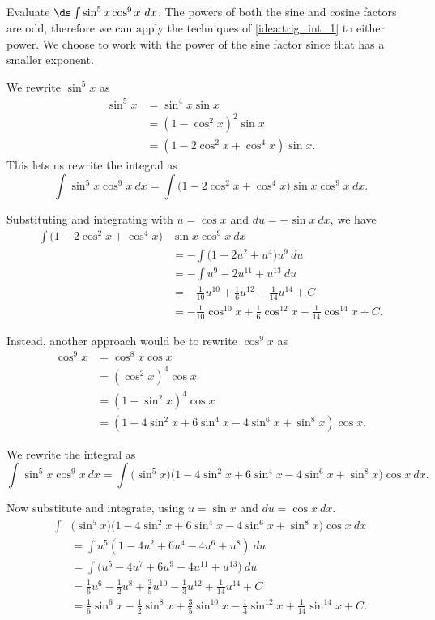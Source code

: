 \begin{example}\label{ex_trigint2}
Evaluate $\ds \int\sin^5x\cos^9x\ dx$.
\solution
The powers of both the sine and cosine factors are odd, therefore we can apply the techniques of \autoref{idea:trig_int_1} to either power.
We choose to work with the power of the sine factor since that has a smaller exponent.

We rewrite $\sin^5x$ as
\begin{align*}
 \sin^5x&=\sin^4x\sin x\\
 &=(1-\cos^2x)^2\sin x\\
 &=(1-2\cos^2x+\cos^4x)\sin x.
\end{align*}
This lets us rewrite the integral as
\[
\int\sin^5x\cos^9x\ dx=\int\big(1-2\cos^2x+\cos^4x\big)\sin x\cos^9x\ dx.
\]

Substituting and integrating with $u=\cos x$ and $du=-\sin x\ dx$, we have
\begin{align*}
\int\big(1-2\cos^2x+\cos^4x\big)&\sin x\cos^9x\ dx\\
&=-\int\big(1-2u^2+u^4)u^9\ du\\
&=-\int u^9-2u^{11}+u^{13}\ du\\
&=-\frac1{10}u^{10}+\frac16u^{12}-\frac1{14}u^{14}+C\\
&=-\frac1{10}\cos^{10}x+\frac16\cos^{12}x-\frac1{14}\cos^{14}x+C.
\end{align*}

Instead, another approach would be to rewrite $\cos^9x$ as
\begin{align*} \cos^9 x &= \cos^8x\cos x \\
				&= (\cos^2x)^4\cos x \\
				&= (1-\sin^2x)^4\cos x \\
				&= (1-4\sin^2x+6\sin^4x-4\sin^6x+\sin^8x)\cos x.
\end{align*}

We rewrite the integral as 
\[\int\sin^5x\cos^9x\ dx = \int\bigl(\sin^5x\bigr)\bigl(1-4\sin^2x+6\sin^4x-4\sin^6x+\sin^8x\bigr)\cos x\ dx.\]

Now substitute and integrate, using $u = \sin x $ and $du = \cos x\ dx$.
\begin{align*}
 \int & \bigl(\sin^5x\bigr)\bigl(1-4\sin^2x+6\sin^4x-4\sin^6x+\sin^8x\bigr)\cos x\ dx \\
 &=\int u^5(1-4u^2+6u^4-4u^6+u^8)\ du \\
 &= \int\bigl(u^5-4u^7+6u^9-4u^{11}+u^{13}\bigr)\ du \\
 &= \frac16u^6-\frac12u^8+\frac35u^{10}-\frac13u^{12}+\frac{1}{14}u^{14}+C\\
 &= \frac16\sin^6 x-\frac12\sin^8 x+\frac35\sin^{10} x-\frac13\sin^{12} x+\frac{1}{14}\sin^{14} x+C.
\end{align*}
%
\end{example}

